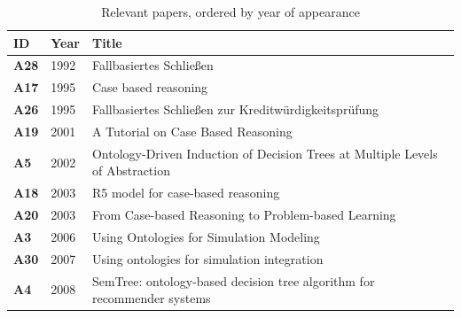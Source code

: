             
        	    {
        	    \begin{longtable}{ | m{1cm} | m{1.5cm} | m{12cm} | }
                    \caption{\label{tab:rel-papers} Relevant papers, ordered by year of appearance}\\
                    \hline
                    \textbf{ID} &\textbf{Year} &\textbf{Title} \\
                    \hline
                    \endfirsthead
                    
                    \hline
                    \textbf{A28} &1992 &Fallbasiertes Schließen \\ %
                    \hline
                    \textbf{A17} &1995 &Case based reasoning \\ %
                    \hline
                    \textbf{A26} &1995 &Fallbasiertes Schließen zur Kreditwürdigkeitsprüfung \\ %
                    \hline
                    \textbf{A19} &2001 &A Tutorial on Case Based Reasoning \\ %
                    \hline
                    \textbf{A5} &2002 &Ontology-Driven Induction of Decision Trees at Multiple Levels of Abstraction \\ %
                    \hline
                    \textbf{A18} &2003 &R5 model for case-based reasoning \\ %
                    \hline
                    \textbf{A20} &2003 &From Case-based Reasoning to Problem-based Learning \\ %
                    \hline
                    \textbf{A3} &2006 &Using Ontologies for Simulation Modeling \\ %
                    \hline
                    \textbf{A30} &2007 &Using ontologies for simulation integration \\ %
                    \hline
                    \textbf{A4} &2008 &SemTree: ontology-based decision tree algorithm for recommender systems \\ %

\end{longtable}}

